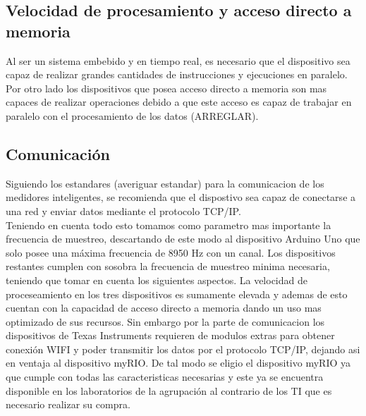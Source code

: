 \subsection{Velocidad de procesamiento y acceso directo a memoria}
\par Al ser un sistema embebido y en tiempo real, es necesario que el dispositivo
sea capaz de realizar grandes cantidades de instrucciones y ejecuciones en paralelo.
Por otro lado los dispositivos que posea acceso directo a memoria son mas capaces de
realizar operaciones debido a que este acceso es capaz de trabajar en paralelo con
el procesamiento de los datos (ARREGLAR).

\subsection{Comunicación}
\par Siguiendo los estandares (averiguar estandar) para la comunicacion de los
medidores inteligentes, se recomienda que el dispostivo sea capaz de conectarse a una
red y enviar datos mediante el protocolo TCP/IP. \\

Teniendo en cuenta todo esto tomamos como parametro mas importante la frecuencia de
muestreo, descartando de este modo al dispositivo Arduino Uno que solo posee una
máxima frecuencia de 8950 Hz con un canal. Los dispositivos restantes cumplen con
sosobra la frecuencia de muestreo minima necesaria, teniendo que tomar en cuenta los
siguientes aspectos. La velocidad de proceseamiento en los tres dispositivos es
sumamente elevada y ademas de esto cuentan con la capacidad de acceso directo a
memoria dando un uso mas optimizado de sus recursos. Sin embargo por la parte de
comunicacion los dispositivos de Texas Instruments requieren de modulos extras
para obtener conexión WIFI y poder transmitir los datos por el protocolo TCP/IP,
dejando asi en ventaja al dispositivo myRIO. De tal modo se eligio el dispositivo 
myRIO ya que cumple con todas las caracteristicas necesarias y este ya se encuentra
disponible en los laboratorios de la agrupación al contrario de los TI que es necesario
realizar su compra.
